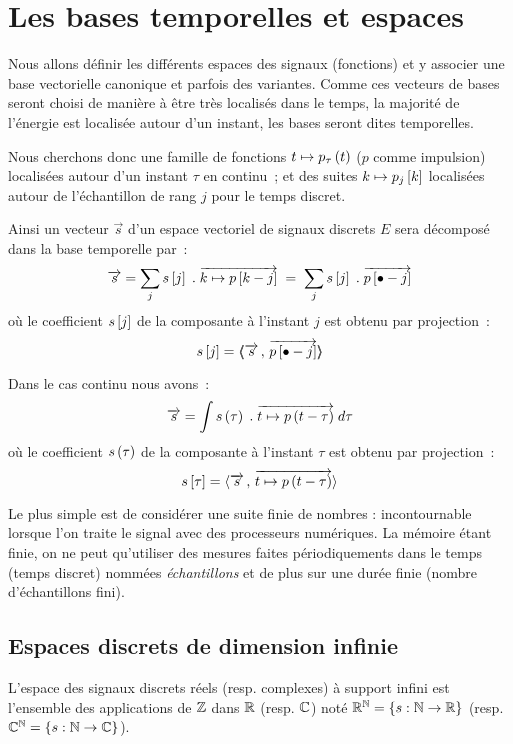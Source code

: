 \section{Les bases temporelles et espaces}
Nous allons définir les différents espaces des signaux (fonctions) et
y associer une base vectorielle \og canonique\fg{} et parfois des
variantes. Comme ces vecteurs de bases seront choisi de manière à être
très localisés dans le temps, la majorité de l'énergie est localisée
autour d'un instant, les bases seront dites temporelles.

Nous cherchons donc une famille de fonctions $t\mapsto p_\tau\left(t\right)$
($p$ comme impulsion) localisées autour d'un instant $\tau$ en
continu~; et des suites $k\mapsto p_{j}\left[k\right]$ localisées autour de
l'échantillon de rang $j$ pour le temps discret.

Ainsi un vecteur $\vec{s}$ d'un espace vectoriel de signaux discrets
$E$ sera décomposé dans la base temporelle par~:
$$ \overrightarrow{s} = \sum\limits_j s\left[j\right]\;.\;\overrightarrow{k \mapsto p\left[k-j\right]} \;=\; \sum\limits_j  s\left[j\right]\;.\;\overrightarrow{p\left[\bullet-j\right]} $$
où le coefficient $s\left[j\right]$ de la composante à l'instant $j$ est obtenu
par projection~:
$$ s\left[j\right] = \langle\!\!\langle\overrightarrow{s}\,,\,\overrightarrow{p\left[\bullet-j\right]}\rangle\!\!\rangle$$

Dans le cas continu nous avons~:
$$ \overrightarrow{s} = \int s\left(\tau\right)\;.\;\overrightarrow{t \mapsto p\left(t-\tau\right)}\; d\tau$$
où le coefficient $s\left(\tau\right)$ de la composante à l'instant $\tau$ est
obtenu par projection~:
$$ s\left[\tau\right] = \langle\overrightarrow{s}\,,\,\overrightarrow{t \mapsto p\left(t-\tau\right)}\rangle$$

Le plus simple est de considérer une suite finie de nombres :
incontournable lorsque l'on traite le signal avec des processeurs
numériques.  La mémoire étant finie, on ne peut qu'utiliser des
mesures faites périodiquements dans le temps (temps discret) nommées
\emph{échantillons} et de plus sur une durée finie (nombre
d'échantillons fini).


\subsection{Espaces discrets de dimension infinie}
\label{sec:RN}
L'espace des signaux discrets réels (resp. complexes) à support infini
est l'ensemble des applications de $\mathbb{Z}$ dans $\mathbb{R}$ (resp. $\mathbb{C}$) noté
$\mathbb{R}^{\mathbb{N}} = \left\{s : \mathbb{N} \to \mathbb{R} \right\}$ (resp.
$\mathbb{C}^{\mathbb{N}} = \left\{s : \mathbb{N} \to \mathbb{C} \right\}$).

